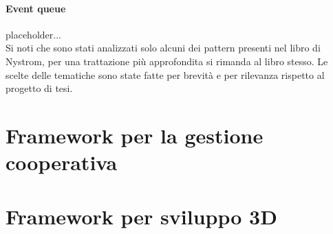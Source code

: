 \paragraph{Event queue}
placeholder...\\
\newline
Si noti che sono stati analizzati solo alcuni dei pattern presenti nel libro di 
Nystrom, per una trattazione più approfondita si rimanda al libro stesso. Le scelte
delle tematiche sono state fatte per brevità e per rilevanza rispetto al progetto
di tesi.

\section{Framework per la gestione cooperativa}\label{sec:Cooperativa}

\section{Framework per sviluppo 3D}\label{sec:FW3D}